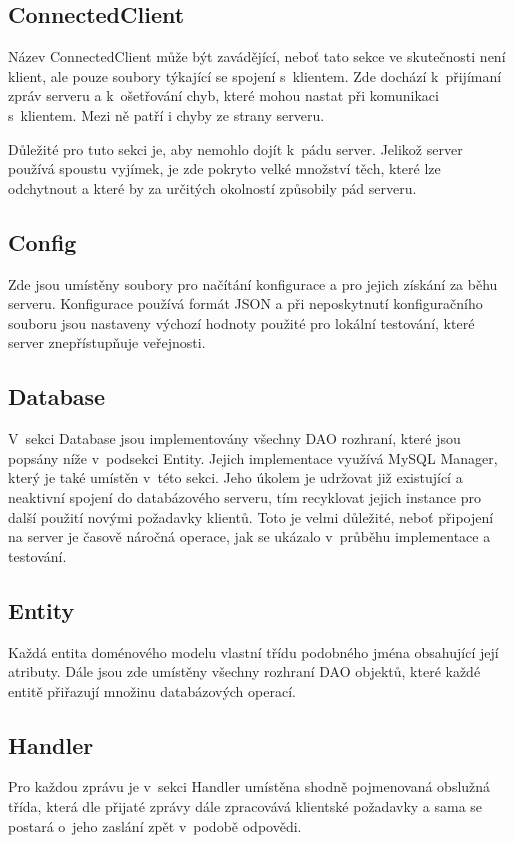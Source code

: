 \documentclass[thesis=B,czech]{FITthesis}[2013/10/20]
\begin{document}
\subsection{ConnectedClient}
Název ConnectedClient může být zavádějící, neboť tato sekce ve skutečnosti není klient, ale pouze soubory týkající se spojení s~klientem. Zde dochází k~přijímaní zpráv serveru a k~ošetřování chyb, které mohou nastat při komunikaci s~klientem. Mezi ně patří i chyby ze strany serveru.

Důležité pro tuto sekci je, aby nemohlo dojít k~pádu server. Jelikož server používá spoustu vyjímek, je zde pokryto velké množství těch, které lze odchytnout a které by za určitých okolností způsobily pád serveru.

\subsection{Config}
Zde jsou umístěny soubory pro načítání konfigurace a pro jejich získání za běhu serveru. Konfigurace používá formát JSON a při neposkytnutí konfiguračního souboru jsou nastaveny výchozí hodnoty použité pro lokální testování, které server znepřístupňuje veřejnosti.

\subsection{Database}
V~sekci Database jsou implementovány všechny DAO rozhraní, které jsou popsány níže v~podsekci Entity. Jejich implementace využívá MySQL Manager, který je také umístěn v~této sekci. Jeho úkolem je udržovat již existující a neaktivní spojení do databázového serveru, tím recyklovat jejich instance pro další použití novými požadavky klientů. Toto je velmi důležité, neboť připojení na server je časově náročná operace, jak se ukázalo v~průběhu implementace a testování.

\subsection{Entity}
Každá entita doménového modelu vlastní třídu podobného jména obsahující její atributy. Dále jsou zde umístěny všechny rozhraní DAO objektů, které každé entitě přiřazují množinu databázových operací.

\subsection{Handler}
Pro každou zprávu je v~sekci Handler umístěna shodně pojmenovaná obslužná třída, která dle přijaté zprávy dále zpracovává klientské požadavky a sama se postará o~jeho zaslání zpět v~podobě odpovědi.
\end{document}
